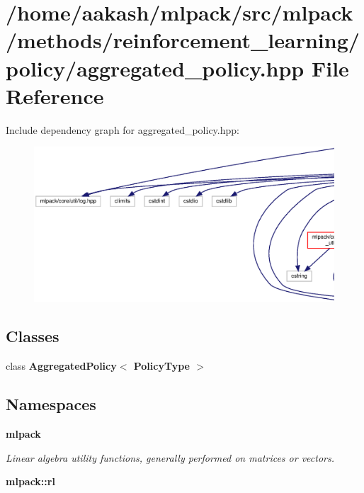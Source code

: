\section{/home/aakash/mlpack/src/mlpack/methods/reinforcement\+\_\+learning/policy/aggregated\+\_\+policy.hpp File Reference}
\label{aggregated__policy_8hpp}
Include dependency graph for aggregated\+\_\+policy.\+hpp\+:
\nopagebreak
\begin{figure}[H]
\begin{center}
\leavevmode
\includegraphics[width=350pt]{aggregated__policy_8hpp__incl}
\end{center}
\end{figure}
\subsection*{Classes}
\begin{DoxyCompactItemize}
\item 
class \textbf{ Aggregated\+Policy$<$ Policy\+Type $>$}
\end{DoxyCompactItemize}
\subsection*{Namespaces}
\begin{DoxyCompactItemize}
\item 
 \textbf{ mlpack}
\begin{DoxyCompactList}\small\item\em Linear algebra utility functions, generally performed on matrices or vectors. \end{DoxyCompactList}\item 
 \textbf{ mlpack\+::rl}
\end{DoxyCompactItemize}


